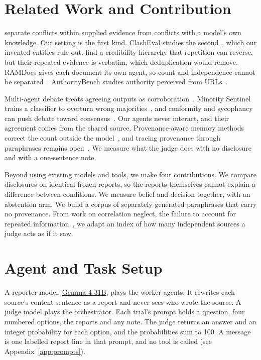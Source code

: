\documentclass[11pt]{article}
\begin{document}
\section{Related Work and Contribution}
\label{sec:related}
\citet{xu2024survey} separate conflicts within supplied evidence from conflicts with a model's own knowledge. Our setting is the first kind. ClashEval studies the second~\citep{wu2024clasheval}, which our invented entities rule out. \citet{schuster2026whose} find a credibility hierarchy that repetition can reverse, but their repeated evidence is verbatim, which deduplication would remove. RAMDocs gives each document its own agent, so count and independence cannot be separated~\citep{wang2025ramdocs}. AuthorityBench studies authority perceived from URLs~\citep{yao2026authoritybench}.

Multi-agent debate treats agreeing outputs as corroboration~\citep{du2023debate}. Minority Sentinel trains a classifier to overturn wrong majorities~\citep{he2026minority}, and conformity and sycophancy can push debate toward consensus~\citep{cui2025freemad,yao2025sycophancy}. Our agents never interact, and their agreement comes from the shared source. Provenance-aware memory methods correct the count outside the model~\citep{qi2026memory,lin2026cama}, and tracing provenance through paraphrases remains open~\citep{wang2026traces}. We measure what the judge does with no disclosure and with a one-sentence note.

Beyond using existing models and tools, we make four contributions. We compare disclosures on identical frozen reports, so the reports themselves cannot explain a difference between conditions. We measure belief and decision together, with an abstention arm. We build a corpus of separately generated paraphrases that carry no provenance. From work on correlation neglect, the failure to account for repeated information~\citep{demarzo2003persuasion,enke2019correlation}, we adapt an index of how many independent sources a judge acts as if it saw.

\section{Agent and Task Setup}
\label{sec:setup}\label{sec:judges}
A reporter model, \href{https://openrouter.ai/google/gemma-4-31b-it}{Gemma 4 31B}, plays the worker agents. It rewrites each source's content sentence as a report and never sees who wrote the source. A judge model plays the orchestrator. Each trial's prompt holds a question, four numbered options, the reports and any note. The judge returns an answer and an integer probability for each option, and the probabilities sum to 100. A message is one labelled report line in that prompt, and no tool is called (see Appendix~\ref{app:prompts}).
\end{document}

